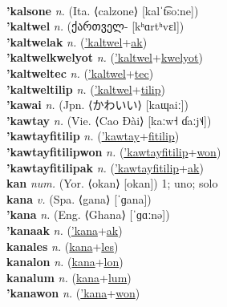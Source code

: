  \label{'kalcium} \\
\textbf{'kalsone} \textit{n.} (Ita. ⟨calzone⟩ [kalˈt͡soːne])
 \label{'kalsone} \\
\textbf{'kaltwel} \textit{n.} ({\georgian{}ქართველ-} [kʰɑrtʰvɛl])
 \label{'kaltwel} \\
\textbf{'kaltwelak} \textit{n.} (\hyperref['kaltwel]{'kaltwel}+\hyperref[ak]{ak})
 \label{'kaltwelak} \\
\textbf{'kaltwelkwelyot} \textit{n.} (\hyperref['kaltwel]{'kaltwel}+\hyperref[kwelyot]{kwelyot})
 \label{'kaltwelkwelyot} \\
\textbf{'kaltweltec} \textit{n.} (\hyperref['kaltwel]{'kaltwel}+\hyperref[tec]{tec})
 \label{'kaltweltec} \\
\textbf{'kaltweltilip} \textit{n.} (\hyperref['kaltwel]{'kaltwel}+\hyperref[tilip]{tilip})
 \label{'kaltweltilip} \\
\textbf{'kawai} \textit{n.} (Jpn. ⟨かわいい⟩ [kaɰaiː])
 \label{'kawai} \\
\textbf{'kawtay} \textit{n.} (Vie. ⟨Cao Đài⟩ [kaːw˧ ɗaːj˦˨])
 \label{'kawtay} \\
\textbf{'kawtayfitilip} \textit{n.} (\hyperref['kawtay]{'kawtay}+\hyperref[fitilip]{fitilip})
 \label{'kawtayfitilip} \\
\textbf{'kawtayfitilipwon} \textit{n.} (\hyperref['kawtayfitilip]{'kawtayfitilip}+\hyperref[won]{won})
 \label{'kawtayfitilipwon} \\
\textbf{'kawtayfitilipak} \textit{n.} (\hyperref['kawtayfitilip]{'kawtayfitilip}+\hyperref[ak]{ak})
 \label{'kawtayfitilipak} \\
\textbf{kan} \textit{num.} (Yor. ⟨okan⟩ [okan])
1; uno; solo \label{kan} \\
\textbf{kana} \textit{v.} (Spa. ⟨gana⟩ [ˈɡana])
 \label{kana} \\
\textbf{'kana} \textit{n.} (Eng. ⟨Ghana⟩ [ˈɡɑːnə])
 \label{'kana} \\
\textbf{'kanaak} \textit{n.} (\hyperref['kana]{'kana}+\hyperref[ak]{ak})
 \label{'kanaak} \\
\textbf{kanales} \textit{n.} (\hyperref[kana]{kana}+\hyperref[les]{les})
 \label{kanales} \\
\textbf{kanalon} \textit{n.} (\hyperref[kana]{kana}+\hyperref[lon]{lon})
 \label{kanalon} \\
\textbf{kanalum} \textit{n.} (\hyperref[kana]{kana}+\hyperref[lum]{lum})
 \label{kanalum} \\
\textbf{'kanawon} \textit{n.} (\hyperref['kana]{'kana}+\hyperref[won]{won})
